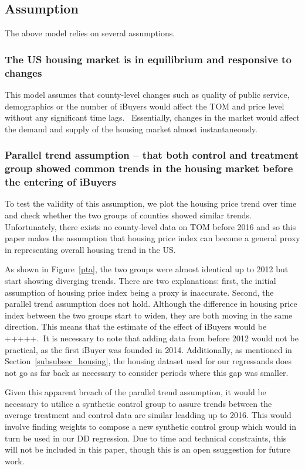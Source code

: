 \subsection{Assumption}

The above model relies on several assumptions.

\subsubsection{The US housing market is in equilibrium and responsive to changes}

This model assumes that county-level changes such as quality of public service, demographics or the number of iBuyers would affect the TOM and price level without any significant time lags.  Essentially, changes in the market would affect the demand and supply of the housing market almost instantaneously. 

\subsubsection{Parallel trend assumption – that both control and treatment group showed common trends in the housing market before the entering of iBuyers}

To test the validity of this assumption, we plot the housing price trend over time and check whether the two groups of counties showed similar trends. Unfortunately, there exists no county-level data on TOM before 2016 and so this paper makes the assumption that housing price index can become a general proxy in representing overall housing trend in the US.  

As shown in Figure~\ref{pta}, the two groups were almost identical up to 2012 but start showing diverging trends. There are two explanations: first, the initial assumption of housing price index being a proxy is inaccurate. Second, the parallel trend assumption does not hold. Although the difference in housing price index between the two groups start to widen, they are both moving in the same direction. This means that the estimate of the effect of iBuyers would be +++++. It is necessary to note that adding data from before 2012 would not be practical, as the first iBuyer was founded in 2014. Additionally, as mentioned in Section~\ref{subsubsec_housing}, the housing dataset used for our regressands does not go as far back as necessary to consider periods where this gap was smaller.

Given this apparent breach of the parallel trend assumption, it would be necessary to utilice a synthetic control group to assure trends between the average treatment and control data are similar leadding up to 2016. This would involve finding weights to compose a new synthetic control group which would in turn be used in our DD regression. Due to time and technical constraints, this will not be included in this paper, though this is an open ssuggestion for future work.

